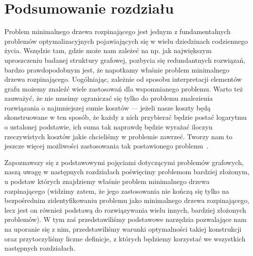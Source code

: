 \section{Podsumowanie rozdziału}

Problem minimalnego drzewa rozpinającego jest jednym z fundamentalnych problemów optymalizacyjnych pojawiających się w wielu dziedzinach codziennego życia. Wszędzie tam, gdzie może nam zależeć na np. jak największym uproszczeniu badanej struktury grafowej, pozbycia się redundantnych rozwiązań, bardzo prawdopodobnym jest, że napotkamy właśnie problem minimalnego drzewa rozpinającego. Uogólniając, zależnie od sposobu interpretacji elementów grafu możemy znaleźć wiele zastosowań dla wspomnianego problemu. Warto też zauważyć, że nie musimy ograniczać się tylko do problemu znalezienia rozwiązania o najmniejszej sumie kosztów --- jeżeli nasze koszty będą skonstruowane w ten sposób, że każdy z nich przybierać będzie postać logarytmu o ustalonej podstawie, ich suma tak naprawdę będzie wyrażać iloczyn rzeczywistych kosztów jakie chcieliśmy w problemie zawrzeć. Tworzy nam to jeszcze więcej możliwości zastosowania tak postawionego problemu~\cite[$512$--$516$]{Ahuja:1993:NFT:137406}.

Zapoznawszy się z podstawowymi pojęciami dotyczącymi problemów grafowych, naszą uwagę w następnych rozdziałach poświęcimy problemom bardziej złożonym, u podstaw których znajdziemy właśnie problem minimalnego drzewa rozpinającego (widzimy zatem, że jego zastosowania nie kończą się tylko na bezpośrednim zidentyfikowaniu problemu jako minimalnego drzewa rozpinającego, lecz jest on również podstawą do rozwiązywania wielu innych, bardziej złożonych problemów). W tym zaś przedstawiliśmy podstawowe narzędzia pozwalające nam na uporanie się z nim, przedstawiliśmy warunki optymalności takiej konstrukcji oraz przytoczyliśmy liczne definicje, z których będziemy korzystać we wszystkich następnych rozdziałach.